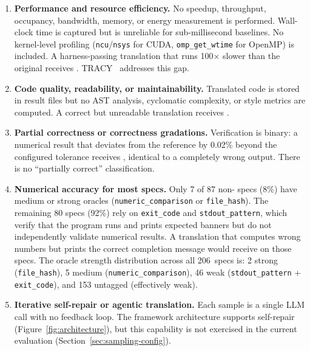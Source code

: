 \begin{enumerate}
  \item \textbf{Performance and resource efficiency.} No speedup, throughput,
    occupancy, bandwidth, memory, or energy measurement is performed.
    Wall-clock time is captured but is unreliable for sub-millisecond baselines.
    No kernel-level profiling (\texttt{ncu}/\texttt{nsys} for CUDA,
    \texttt{omp\_get\_wtime} for OpenMP) is included. A harness-passing
    translation that runs 100$\times$ slower than the original receives
    \pass{}. TRACY~\cite{TRACY2025} addresses this gap.

  \item \textbf{Code quality, readability, or maintainability.} Translated
    code is stored in result files but no AST analysis, cyclomatic complexity,
    or style metrics are computed. A correct but unreadable translation receives
    \pass{}.

  \item \textbf{Partial correctness or correctness gradations.} Verification
    is binary: a numerical result that deviates from the reference by 0.02\%
    beyond the configured tolerance receives \verifyfail{}, identical to a
    completely wrong output. There is no ``partially correct'' classification.

  \item \textbf{Numerical accuracy for most specs.} Only 7 of 87
    non-\knownfail{} specs (8\%) have medium or strong oracles
    (\texttt{numeric\_comparison} or \texttt{file\_hash}). The remaining 80
    specs (92\%) rely on \texttt{exit\_code} and \texttt{stdout\_pattern},
    which verify that the program runs and prints expected banners but do not
    independently validate numerical results. A translation that computes wrong
    numbers but prints the correct completion message would receive \pass{} on
    those specs. The oracle strength distribution across all 206~specs is: 2
    strong (\texttt{file\_hash}), 5 medium (\texttt{numeric\_comparison}), 46
    weak (\texttt{stdout\_pattern} + \texttt{exit\_code}), and 153 untagged
    (effectively weak).

  \item \textbf{Iterative self-repair or agentic translation.} Each sample is
    a single LLM call with no feedback loop. The framework architecture
    supports self-repair (Figure~\ref{fig:architecture}), but this capability
    is not exercised in the current evaluation
    (Section~\ref{sec:sampling-config}).


\end{enumerate}
